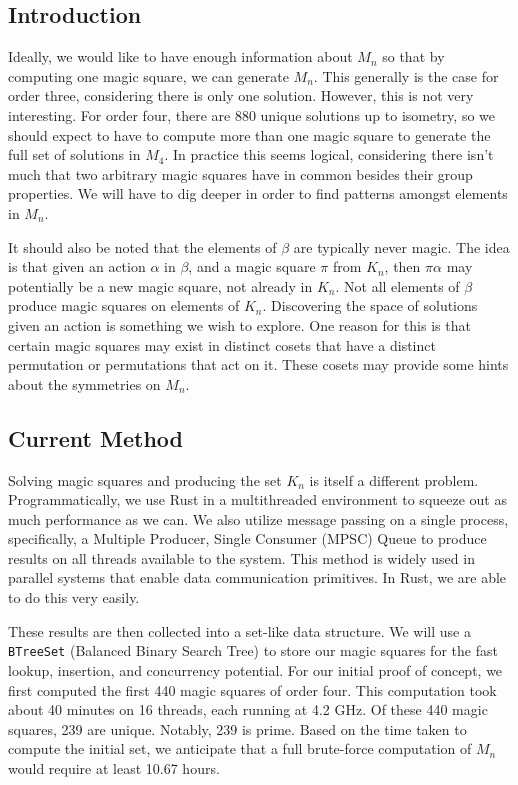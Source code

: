 \documentclass{rhumj_new}
\begin{document}
\subsection{Introduction}

Ideally, we would like to have enough information about $M_n$ so that by computing one magic
square, we can generate $M_n$. This generally is the case for order three, considering there is
only one solution. However, this is not very interesting. For order four, there are 880 unique
solutions up to isometry, so we should expect to have to compute more than one magic square to
generate the full set of solutions in $M_4$. In practice this seems logical, considering there
isn't much that two arbitrary magic squares have in common besides their group properties. We will
have to dig deeper in order to find patterns amongst elements in $M_n$.

It should also be noted that the elements of $\beta$ are typically never magic. The idea is that
given an action $\alpha$ in $\beta$, and a magic square $\pi$ from $K_n$, then $\pi\alpha$ may
potentially be a new magic square, not already in $K_n$. Not all elements of $\beta$ produce magic
squares on elements of $K_n$. Discovering the space of solutions given an action is something we
wish to explore. One reason for this is that certain magic squares may exist in distinct cosets
that have a distinct permutation or permutations that act on it. These cosets may provide some
hints about the symmetries on $M_n$.

\subsection{Current Method}

Solving magic squares and producing the set $K_n$ is itself a different problem. Programmatically,
we use Rust in a multithreaded environment to squeeze out as much performance as we can. We also
utilize message passing on a single process, specifically, a Multiple Producer, Single Consumer
(MPSC) Queue to produce results on all threads available to the system. This method is widely used
in parallel systems that enable data communication primitives. In Rust, we are able to do this very
easily.

These results are then collected into a set-like data structure. We will use a \texttt{BTreeSet}
(Balanced Binary Search Tree) to store our magic squares for the fast lookup, insertion, and
concurrency potential. For our initial proof of concept, we first computed the first 440 magic
squares of order four. This computation took about 40 minutes on 16 threads, each running at 4.2
GHz. Of these 440 magic squares, 239 are unique. Notably, 239 is prime. Based on the time taken to
compute the initial set, we anticipate that a full brute-force computation of $M_n$ would require
at least 10.67 hours.
\end{document}
